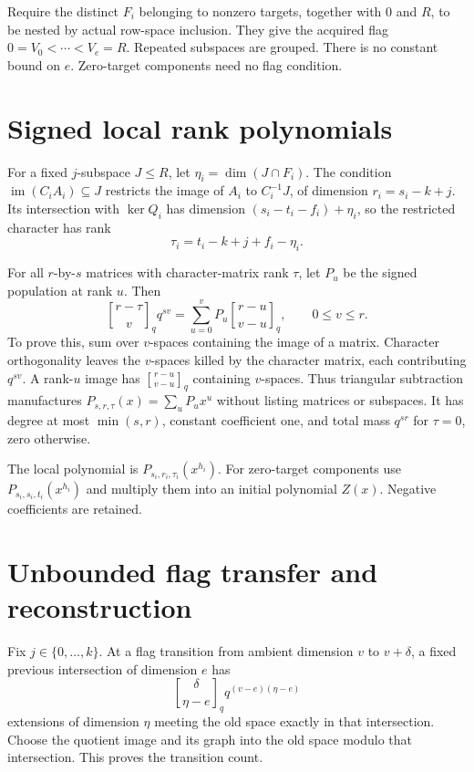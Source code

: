 \documentclass[11pt]{article}
\newcommand{\im}{\operatorname{im}}\newcommand{\Tr}{\operatorname{Tr}}
\begin{document}
Require the distinct $F_i$ belonging to nonzero targets, together with
$0$ and $R$, to be nested by actual row-space inclusion. They give the
acquired flag $0=V_0<\cdots<V_e=R$. Repeated subspaces are grouped.
There is no constant bound on $e$. Zero-target components need no flag
condition.

\section{Signed local rank polynomials}
For a fixed $j$-subspace $J\le R$, let $\eta_i=\dim(J\cap F_i)$.
The condition $\im(C_iA_i)\subseteq J$ restricts the image of $A_i$ to
$C_i^{-1}J$, of dimension $r_i=s_i-k+j$. Its intersection with
$\ker Q_i$ has dimension $(s_i-t_i-f_i)+\eta_i$, so the restricted
character has rank
\begin{equation}\label{eq:tau}
 \tau_i=t_i-k+j+f_i-\eta_i.
\end{equation}

For all $r$-by-$s$ matrices with character-matrix rank $\tau$, let $P_u$
be the signed population at rank $u$. Then
\begin{equation}\label{eq:local}
 {r-\tau\brack v}_q q^{sv}
   =\sum_{u=0}^v P_u{r-u\brack v-u}_q,\qquad 0\le v\le r.
\end{equation}
To prove this, sum over $v$-spaces containing the image of a matrix.
Character orthogonality leaves the $v$-spaces killed by the character
matrix, each contributing $q^{sv}$. A rank-$u$ image has
${r-u\brack v-u}_q$ containing $v$-spaces. Thus triangular subtraction
manufactures $P_{s,r,\tau}(x)=\sum_uP_ux^u$ without listing matrices or
subspaces. It has degree at most $\min(s,r)$, constant coefficient one,
and total mass $q^{sr}$ for $\tau=0$, zero otherwise.

The local polynomial is $P_{s_i,r_i,\tau_i}(x^{h_i})$.
For zero-target components use $P_{s_i,s_i,t_i}(x^{h_i})$ and multiply
them into an initial polynomial $Z(x)$. Negative coefficients are retained.

\section{Unbounded flag transfer and reconstruction}
Fix $j\in\{0,\ldots,k\}$. At a flag transition from ambient dimension
$v$ to $v+\delta$, a fixed previous intersection of dimension $e$ has
\begin{equation}\label{eq:transfer}
 {\delta\brack\eta-e}_q q^{(v-e)(\eta-e)}
\end{equation}
extensions of dimension $\eta$ meeting the old space exactly in that
intersection. Choose the quotient image and its graph into the old space
modulo that intersection. This proves the transition count.
\end{document}
